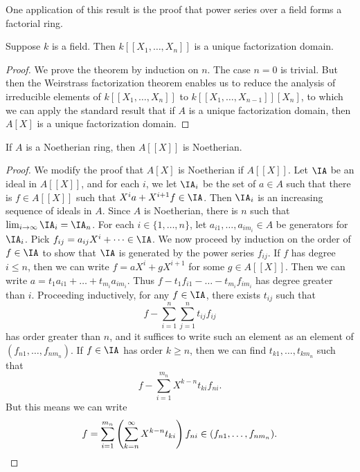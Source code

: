 One application of this result is the proof that power series over a field forms a factorial ring.

\begin{theorem}
    Suppose $k$ is a field. Then $k[[X_1,\dots,X_n]]$ is a unique factorization domain.
\end{theorem}
\begin{proof}
    We prove the theorem by induction on $n$. The case $n = 0$ is trivial. But then the Weirstrass factorization theorem enables us to reduce the analysis of irreducible elements of $k[[X_1,\dots,X_n]]$ to $k[[X_1,\dots,X_{n-1}]][X_n]$, to which we can apply the standard result that if $A$ is a unique factorization domain, then $A[X]$ is a unique factorization domain.
\end{proof}

\begin{theorem}
    If $A$ is a Noetherian ring, then $A[[X]]$ is Noetherian.
\end{theorem}
\begin{proof}
    We modify the proof that $A[X]$ is Noetherian if $A[[X]]$. Let $\IA$ be an ideal in $A[[X]]$, and for each $i$, we let $\IA_i$ be the set of $a \in A$ such that there is $f \in A[[X]]$ such that $X^i a + X^{i+1} f \in \IA$. Then $\IA_i$ is an increasing sequence of ideals in $A$. Since $A$ is Noetherian, there is $n$ such that $\lim_{i \to \infty} \IA_i = \IA_n$. For each $i \in \{ 1, \dots, n \}$, let $a_{i1}, \dots, a_{im_i} \in A$ be generators for $\IA_i$. Pick $f_{ij} = a_{ij}X^i + \dots \in \IA$. We now proceed by induction on the order of $f \in \IA$ to show that $\IA$ is generated by the power series $f_{ij}$. If $f$ has degree $i \leq n$, then we can write $f = aX^i + g X^{i+1}$ for some $g \in A[[X]]$. Then we can write $a = t_1 a_{i1} + \dots + t_{m_i} a_{im_i}$. Thus $f - t_1 f_{i1} - \dots - t_{m_i} f_{im_i}$ has degree greater than $i$. Proceeding inductively, for any $f \in \IA$, there exists $t_{ij}$ such that
    \[ f - \sum_{i = 1}^n \sum_{j = 1}^n t_{ij} f_{ij} \]
    has order greater than $n$, and it suffices to write such an element as an element of $(f_{n1}, \dots, f_{nm_n})$. If $f \in \IA$ has order $k \geq n$, then we can find $t_{k1},\dots,t_{km_n}$ such that
    \[ f - \sum_{i = 1}^{m_n} X^{k-n} t_{ki} f_{ni}. \]
    But this means we can write
    \[ f = \sum_{i = 1}^{m_n} \left( \sum_{k = n}^\infty X^{k-n} t_{ki} \right) f_{ni} \in (f_{n1}, \dots, f_{nm_n}). \qedhere \]
\end{proof}






